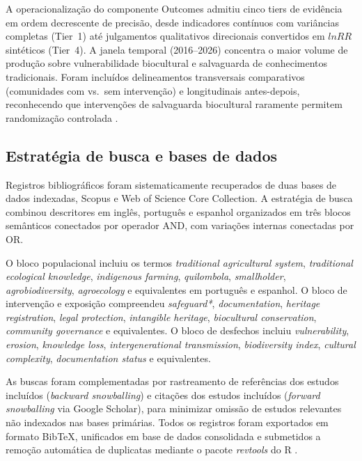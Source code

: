 A operacionalização do componente Outcomes admitiu cinco tiers de evidência em ordem decrescente de precisão, desde indicadores contínuos com variâncias completas (Tier~1) até julgamentos qualitativos direcionais convertidos em $lnRR$ sintéticos (Tier~4). A janela temporal (2016--2026) concentra o maior volume de produção sobre vulnerabilidade biocultural e salvaguarda de conhecimentos tradicionais. Foram incluídos delineamentos transversais comparativos (comunidades com vs.\ sem intervenção) e longitudinais antes-depois, reconhecendo que intervenções de salvaguarda biocultural raramente permitem randomização controlada \cite{Shadish2002}.

\subsection{Estratégia de busca e bases de dados}
\label{sec:search_cap2}

Registros bibliográficos foram sistematicamente recuperados de duas bases de dados indexadas, Scopus e Web of Science Core Collection. A estratégia de busca combinou descritores em inglês, português e espanhol organizados em três blocos semânticos conectados por operador AND, com variações internas conectadas por OR.

O bloco populacional incluiu os termos \textit{traditional agricultural system}, \textit{traditional ecological knowledge}, \textit{indigenous farming}, \textit{quilombola}, \textit{smallholder}, \textit{agrobiodiversity}, \textit{agroecology} e equivalentes em português e espanhol. O bloco de intervenção e exposição compreendeu \textit{safeguard*}, \textit{documentation}, \textit{heritage registration}, \textit{legal protection}, \textit{intangible heritage}, \textit{biocultural conservation}, \textit{community governance} e equivalentes. O bloco de desfechos incluiu \textit{vulnerability}, \textit{erosion}, \textit{knowledge loss}, \textit{intergenerational transmission}, \textit{biodiversity index}, \textit{cultural complexity}, \textit{documentation status} e equivalentes.

As buscas foram complementadas por rastreamento de referências dos estudos incluídos (\textit{backward snowballing}) e citações dos estudos incluídos (\textit{forward snowballing} via Google Scholar), para minimizar omissão de estudos relevantes não indexados nas bases primárias. Todos os registros foram exportados em formato BibTeX, unificados em base de dados consolidada e submetidos a remoção automática de duplicatas mediante o pacote \textit{revtools} do R \cite{Westgate2019}.

